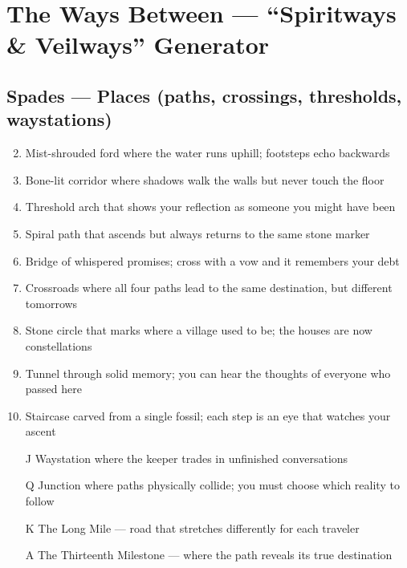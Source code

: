 \chapter{The Ways Between --- ``Spiritways \& Veilways'' Generator}
\label{chap:ways-between}

\section*{Spades --- Places (paths, crossings, thresholds, waystations)}
\label{sec:ways-between-places}
\begin{enumerate}
\setcounter{enumi}{1}
\item Mist-shrouded ford where the water runs uphill; footsteps echo backwards
\item Bone-lit corridor where shadows walk the walls but never touch the floor
\item Threshold arch that shows your reflection as someone you might have been
\item Spiral path that ascends but always returns to the same stone marker
\item Bridge of whispered promises; cross with a vow and it remembers your debt
\item Crossroads where all four paths lead to the same destination, but different tomorrows
\item Stone circle that marks where a village used to be; the houses are now constellations
\item Tunnel through solid memory; you can hear the thoughts of everyone who passed here
\item Staircase carved from a single fossil; each step is an eye that watches your ascent
\item[J] Waystation where the keeper trades in unfinished conversations
\item[Q] Junction where paths physically collide; you must choose which reality to follow
\item[K] The Long Mile --- road that stretches differently for each traveler
\item[A] The Thirteenth Milestone --- where the path reveals its true destination
\end{enumerate}

